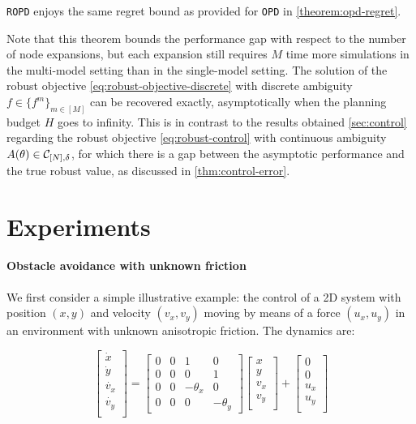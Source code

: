 \documentclass{article}
\begin{document}
\begin{theorem}
\label{theorem:drop-regret}
\texttt{ROPD} enjoys the same regret bound as provided for \texttt{OPD} in \autoref{theorem:opd-regret}.
\end{theorem}

Note that this theorem bounds the performance gap with respect to the number of node expansions, but each expansion still requires $M$ time more simulations in the multi-model setting than in the single-model setting. The solution of the robust objective \eqref{eq:robust-objective-discrete} with discrete ambiguity $f\in\{f^m\}_{m\in[M]}$ can be recovered exactly, asymptotically when the planning budget $H$ goes to infinity. This is in contrast to the results obtained \autoref{sec:control} regarding the robust objective \eqref{eq:robust-control} with continuous ambiguity $A(\theta)\in\mathcal{C}_{[N],\delta}$, for which there is a gap between the asymptotic performance and the true robust value, as discussed in \autoref{thm:control-error}.

\section{Experiments}

\paragraph{Obstacle avoidance with unknown friction}
We first consider a simple illustrative example: the control of a 2D system with position $(x,y)$ and velocity $(v_x, v_y)$ moving by means of a force $(u_x, u_y)$ in an environment with unknown anisotropic friction. The dynamics are:

\begin{equation*}
\begin{bmatrix}
\dot{x}\\
\dot{y}\\
\dot{v_x}\\
\dot{v_y}\\
\end{bmatrix} = 
\begin{bmatrix}
0 & 0 & 1 & 0 \\
0 & 0 & 0 & 1 \\
0 & 0 & -\theta_x & 0 \\
0 & 0 & 0 & -\theta_y
\end{bmatrix}
\begin{bmatrix}
{x}\\
{y}\\
{v_x}\\
{v_y}\\
\end{bmatrix}
+
\begin{bmatrix}
0\\
0\\
{u_x}\\
{u_y}\\
\end{bmatrix}
\end{equation*}
\end{document}
